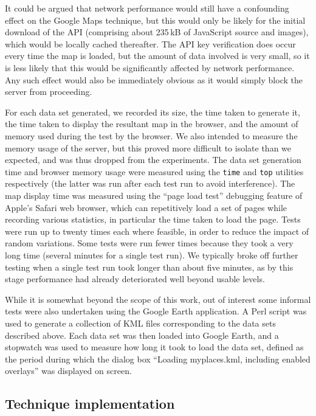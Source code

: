\documentclass[acmtocl,acmnow]{acmtrans2m}
\begin{document}
It could be argued that network performance would still have a
confounding effect on the Google Maps technique, but this would only be
likely for the initial download of the API (comprising about 235\,kB of
JavaScript source and images), which would be locally cached thereafter.
The API key verification does occur every time the map is loaded, but
the amount of data involved is very small, so it is less likely that
this would be significantly affected by network performance. Any such
effect would also be immediately obvious as it would simply block the
server from proceeding.

For each data set generated, we recorded its size, the time taken to
generate it, the time taken to display the resultant map in the browser,
and the amount of memory used during the test by the browser. We also
intended to measure the memory usage of the server, but this proved more
difficult to isolate than we expected, and was thus dropped from the
experiments. The data set generation time and browser memory usage were
measured using the \texttt{time} and \texttt{top} utilities respectively
(the latter was run after each test run to avoid interference). The map
display time was measured using the ``page load test'' debugging feature
of Apple's Safari web browser, which can repetitively load a set of
pages while recording various statistics, in particular the time taken
to load the page. Tests were run up to twenty times each where feasible,
in order to reduce the impact of random variations. Some tests were run
fewer times because they took a very long time (several minutes for a
single test run). We typically broke off further testing when a single
test run took longer than about five minutes, as by this stage
performance had already deteriorated well beyond usable levels.

While it is somewhat beyond the scope of this work, out of interest some
informal tests were also undertaken using the Google Earth application.
A Perl script was used to generate a collection of KML files
corresponding to the data sets described above. Each data set was then
loaded into Google Earth, and a stopwatch was used to measure how long
it took to load the data set, defined as the period during which the
dialog box ``\textsf{Loading myplaces.kml, including enabled overlays}''
was displayed on screen.


\subsection{Technique implementation}
\end{document}
